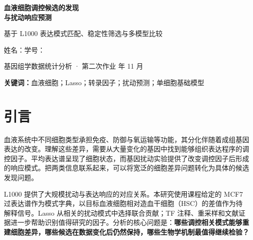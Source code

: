 \documentclass[UTF8,a4paper,11pt,fontset=fandol]{ctexart}
\begin{document}
\thispagestyle{empty}
\begin{center}
{\LARGE\bfseries\color{ink} 血液细胞调控候选的发现\\[5pt]与扰动响应预测}\par\vspace{9pt}
{\large 基于 L1000 表达模式匹配、稳定性筛选与多模型比较}\par\vspace{9pt}
姓名：\underline{\hspace{2.8cm}}\quad 学号：\underline{\hspace{3.5cm}}\par
\small 基因组学数据统计分析 · 第二次作业 年 11 月
\end{center}
\begin{abstract}
从细胞表达状态中寻找值得验证的调控因子，需要把统计匹配与生物学背景联系起来。本研究以造血干细胞为参照，利用 L1000 过表达扰动谱重建血液细胞的表达差异，并以重复抽样确定转录因子候选的优先级。对 21 类目标的筛查显示，扰动字典能够捕获多种血液细胞的差异结构，其中红细胞重建最好，留出基因上的 $R^2$ 为 0.609。深入分析 B 细胞、浆细胞、单核细胞和红细胞后，MYB、负向 BCL6 以及 KLF6／PRDM1 分别形成红系分化、浆细胞程序和髓系状态的机制线索。四类细胞的前十位候选在重新调参的抽样中仍保持至少 90\% 的选择频率，方向全部一致。

进一步在 K562 的单基因及组合 CRISPRa 数据上比较线性基线、GEARS、scGPT 和 scFoundation＋GEARS，将候选发现延伸到干预后的响应预测。共同基因评价中，Ridge 加和与训练条件均值具有接近的平均误差；高变基因评价中，GEARS 的平均误差最低。PRDM1 案例进一步呈现响应幅度与模式相关性两种评价重点。研究建立了以表达程序为起点、以候选稳定性和细胞背景为依据的分析路径，为后续基因调控验证与细胞状态预测提供可追溯的研究线索。
\end{abstract}
\noindent\textbf{关键词：}血液细胞；Lasso；转录因子；扰动预测；单细胞基础模型
\vspace{5pt}
\tableofcontents

\clearpage
\section{引言}
血液系统中不同细胞类型承担免疫、防御与氧运输等功能，其分化伴随着成组基因表达的改变。理解这些差异，需要从大量变化的基因中找到能够组织表达程序的调控因子。平均表达谱呈现了细胞状态，而基因扰动实验提供了改变调控因子后形成的响应模式。把两类信息联系起来，可以将宽泛的细胞差异问题转化为具体的候选发现问题。

L1000 提供了大规模扰动与表达响应的对应关系\cite{R01}。本研究使用课程给定的 MCF7 过表达谱作为模式字典，以目标血液细胞相对造血干细胞（HSC）的差值作为待解释信号。Lasso 从相关的扰动模式中选择联合贡献；TF 注释、重采样和文献证据进一步帮助识别值得研究的因子\cite{R02}。分析的核心问题是：\textbf{哪些调控相关模式能够重建细胞差异，哪些候选在数据变化后仍然保持，哪些生物学机制最值得继续检验？}
\end{document}
